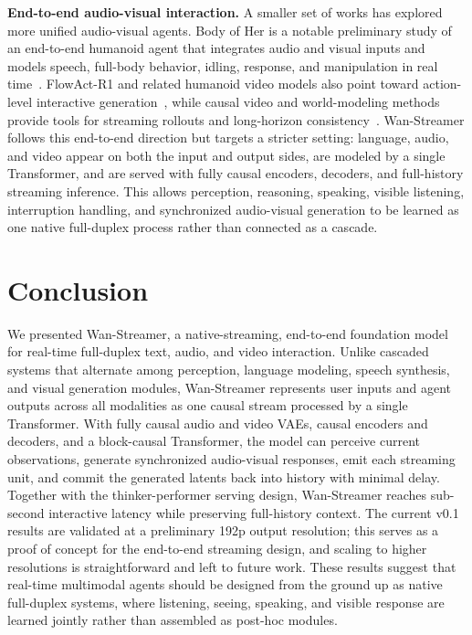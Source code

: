 \documentclass{llmxive}
\providecommand{\model}{Wan-Streamer\xspace}
\begin{document}
\textbf{End-to-end audio-visual interaction.}
A smaller set of works has explored more unified audio-visual agents. Body of Her is a notable preliminary study of an end-to-end humanoid agent that integrates audio and visual inputs and models speech, full-body behavior, idling, response, and manipulation in real time~\citep{ao2024bodyofher}. FlowAct-R1 and related humanoid video models also point toward action-level interactive generation~\citep{flowact2026}, while causal video and world-modeling methods provide tools for streaming rollouts and long-horizon consistency~\citep{chen2024diffusionforcing,huang2025selfforcing,liu2025rollingforcing,worldplay2025,matrixgame2026}. Wan-Streamer follows this end-to-end direction but targets a stricter setting: language, audio, and video appear on both the input and output sides, are modeled by a single Transformer, and are served with fully causal encoders, decoders, and full-history streaming inference. This allows perception, reasoning, speaking, visible listening, interruption handling, and synchronized audio-visual generation to be learned as one native full-duplex process rather than connected as a cascade.


\section{Conclusion}
We presented \model, a native-streaming, end-to-end foundation model for real-time full-duplex text, audio, and video interaction. Unlike cascaded systems that alternate among perception, language modeling, speech synthesis, and visual generation modules, \model represents user inputs and agent outputs across all modalities as one causal stream processed by a single Transformer. With fully causal audio and video VAEs, causal encoders and decoders, and a block-causal Transformer, the model can perceive current observations, generate synchronized audio-visual responses, emit each streaming unit, and commit the generated latents back into history with minimal delay. Together with the thinker-performer serving design, \model reaches sub-second interactive latency while preserving full-history context. The current v0.1 results are validated at a preliminary 192p output resolution; this serves as a proof of concept for the end-to-end streaming design, and scaling to higher resolutions is straightforward and left to future work. These results suggest that real-time multimodal agents should be designed from the ground up as native full-duplex systems, where listening, seeing, speaking, and visible response are learned jointly rather than assembled as post-hoc modules.
\end{document}
